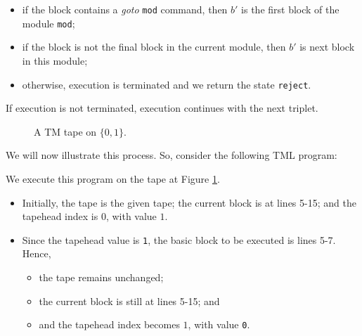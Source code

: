 \begin{appendices}
\begin{itemize}
\begin{itemize}
\begin{itemize}
            \item if the block contains a \textit{goto} \texttt{mod} command, then $b'$ is the first block of the module \texttt{mod};
            \item if the block is not the final block in the current module, then $b'$ is next block in this module;
            \item otherwise, execution is terminated and we return the state \texttt{reject}.
        \end{itemize}
    \end{itemize}
    If execution is not terminated, execution continues with the next triplet.
\end{itemize}

\begin{figure}[htb]
    \centering
    \caption{A TM tape on $\{0, 1\}$.}
    \label{fig:tml_tape_example}
\end{figure}
 
We will now illustrate this process. So, consider the following TML program:

We execute this program on the tape at Figure \ref{fig:tml_tape_example}.
\begin{itemize}
    \item Initially, the tape is the given tape; the current block is at lines 5-15; and the tapehead index is $0$, with value $1$.
    
    \item Since the tapehead value is \texttt{1}, the basic block to be executed is lines 5-7. Hence,
    \begin{itemize}
        \item the tape remains unchanged;
        \item the current block is still at lines 5-15; and
        \item and the tapehead index becomes $1$, with value \texttt{0}.
    \end{itemize}
    

\end{itemize}
\end{appendices}
